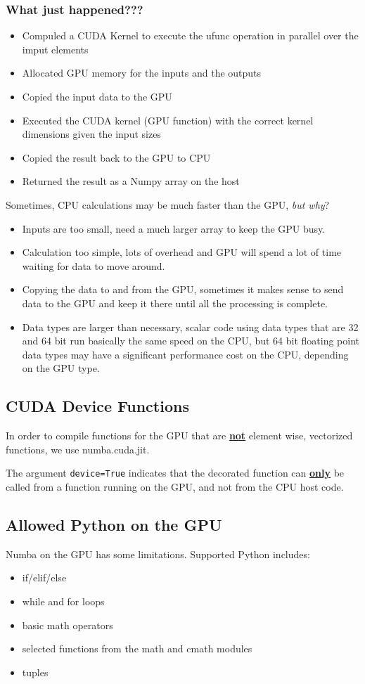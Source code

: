 \documentclass{article}
\begin{document}
\subsubsection{What just happened???}
\begin{itemize}
	\item Compuled a CUDA Kernel to execute the ufunc operation in parallel over the imput elements
	\item Allocated GPU memory for the inputs and the outputs
	\item Copied the input data to the GPU
	\item Executed the CUDA kernel (GPU function) with the correct kernel dimensions given the input sizes
	\item Copied the result back to the GPU to CPU
	\item Returned the result as a Numpy array on the host
\end{itemize}

Sometimes, CPU calculations may be much faster than the GPU, \textit{but why}?

\begin{itemize}
	\item Inputs are too small, need a much larger array to keep the GPU busy.
	\item Calculation too simple, lots of overhead and GPU will spend a lot of time waiting for data to move around.
	\item Copying the data to and from the GPU, sometimes it makes sense to send data to the GPU and keep it there until all the processing is complete.
	\item Data types are larger than necessary, scalar code using data types that are 32 and 64 bit run basically the same speed on the CPU, but 64 bit floating point data types may have a significant performance cost on the CPU, depending on the GPU type.

\end{itemize}

\subsection{CUDA Device Functions}

In order to compile functions for the GPU that are \textbf{\underline{not}} element wise, vectorized functions, we use numba.cuda.jit.


The argument \verb_device=True_ indicates that the decorated function can \textbf{\underline{only}} be called from a function running on the GPU, and not from the CPU host code.

\subsection{Allowed Python on the GPU}
Numba on the GPU has some limitations. Supported Python includes:

\begin{itemize}
	\item if/elif/else
	\item while and for loops
	\item basic math operators
	\item selected functions from the math and cmath modules
	\item tuples
\end{itemize}
\end{document}
